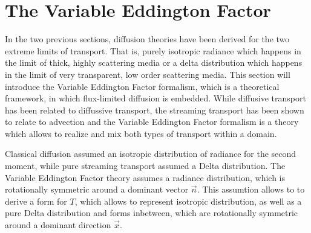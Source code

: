 \section{The Variable Eddington Factor}
\label{sec:fld_vef}

In the two previous sections, diffusion theories have been derived for the two extreme limits of transport. That is, purely isotropic radiance which happens in the limit of thick, highly scattering media or a delta distribution which happens in the limit of very transparent, low order scattering media. This section will introduce the Variable Eddington Factor formalism, which is a theoretical framework, in which flux-limited diffusion is embedded. While diffusive transport has been related to diffussive transport, the streaming transport has been shown to relate to advection and the Variable Eddington Factor formalism is a theory which allows to realize and mix both types of transport within a domain.


Classical diffusion assumed an isotropic distribution of radiance for the second moment, while pure streaming transport assumed a Delta distribution. The Variable Eddington Factor theory assumes a radiance distribution, which is rotationally symmetric around a dominant vector $\vec{n}$. This assumtion allows to to derive a form for $T$, which allows to represent isotropic distribution, as well as a pure Delta distribution and forms inbetween, which are rotationally symmetric around a dominant direction $\vec{x}$.


